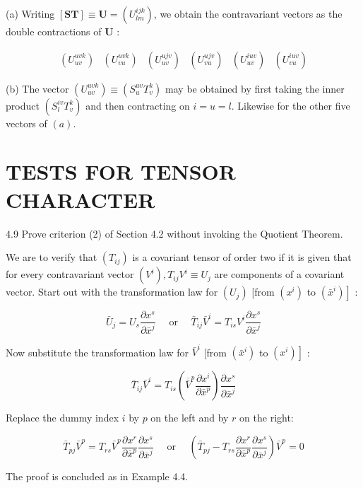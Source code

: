 \documentclass[10pt]{article}
\begin{document}
(a) Writing $[\mathbf{S T}] \equiv \mathbf{U}=\left(U_{l m}^{i j k}\right)$, we obtain the contravariant vectors as the double contractions of $\mathbf{U}$ :

$$
\begin{array}{llllll}
\left(U_{u v}^{u v k}\right) & \left(U_{v u}^{u v k}\right) & \left(U_{u v}^{u j v}\right) & \left(U_{v u}^{u j v}\right) & \left(U_{u v}^{i u v}\right) & \left(U_{v u}^{i u v}\right)
\end{array}
$$

(b) The vector $\left(U_{u v}^{u v k}\right) \equiv\left(S_{u}^{u v} T_{v}^{k}\right)$ may be obtained by first taking the inner product $\left(S_{l}^{i v} T_{v}^{k}\right)$ and then contracting on $i=u=l$. Likewise for the other five vectors of $(a)$.

\section*{TESTS FOR TENSOR CHARACTER}
4.9 Prove criterion (2) of Section 4.2 without invoking the Quotient Theorem.

We are to verify that $\left(T_{i j}\right)$ is a covariant tensor of order two if it is given that for every contravariant vector $\left(V^{i}\right), T_{i j} V^{i} \equiv U_{j}$ are components of a covariant vector. Start out with the transformation law for $\left(U_{j}\right)$ [from $\left(x^{i}\right)$ to $\left.\left(\bar{x}^{i}\right)\right]$ :

$$
\bar{U}_{j}=U_{s} \frac{\partial x^{s}}{\partial \bar{x}^{j}} \quad \text { or } \quad \bar{T}_{i j} \bar{V}^{i}=T_{i s} V^{i} \frac{\partial x^{s}}{\partial \bar{x}^{j}}
$$

Now substitute the transformation law for $\bar{V}^{i}$ [from $\left(\bar{x}^{i}\right)$ to $\left.\left(x^{i}\right)\right]$ :

$$
\bar{T}_{i j} \bar{V}^{i}=T_{i s}\left(\overline{\bar{V}}^{p} \frac{\partial x^{i}}{\partial \bar{x}^{p}}\right) \frac{\partial x^{s}}{\partial \bar{x}^{j}}
$$

Replace the dummy index $i$ by $p$ on the left and by $r$ on the right:

$$
\bar{T}_{p j} \bar{V}^{p}=T_{r s} \bar{V}^{p} \frac{\partial x^{r}}{\partial \bar{x}^{p}} \frac{\partial x^{s}}{\partial \bar{x}^{j}} \quad \text { or } \quad\left(\bar{T}_{p j}-T_{r s} \frac{\partial x^{r}}{\partial \bar{x}^{p}} \frac{\partial x^{s}}{\partial \bar{x}^{j}}\right) \bar{V}^{p}=0
$$

The proof is concluded as in Example 4.4.
\end{document}
